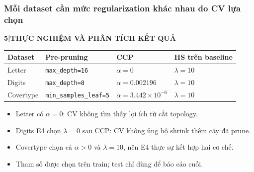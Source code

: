 \documentclass[aspectratio=169,12pt]{beamer}
\newcommand{\chaptertag}[2]{%
  \vspace{-0.16cm}%
  {\scriptsize\bfseries\textcolor{boxframe}{#1\enspace |\enspace #2}}\par
  \vspace{0.12cm}%
}
\begin{document}
\begin{frame}
  \frametitle{Mỗi dataset cần mức regularization khác nhau do CV lựa chọn}
  \chaptertag{5}{THỰC NGHIỆM VÀ PHÂN TÍCH KẾT QUẢ}
  \small
  \begin{tabularx}{\textwidth}{@{}L{2.5cm}YYY@{}}
    \toprule
    \textbf{Dataset} & \textbf{Pre-pruning} & \textbf{CCP} & \textbf{HS trên baseline} \\
    \midrule
    Letter & \texttt{max\_depth=16} & $\alpha=0$ & $\lambda=10$ \\
    Digits & \texttt{max\_depth=8} & $\alpha=0.002196$ & $\lambda=10$ \\
    Covertype & {\scriptsize\texttt{min\_samples\_leaf=5}} & $\alpha=3.442\times10^{-6}$ & $\lambda=10$ \\
    \bottomrule
  \end{tabularx}
  \par\vspace{0.35cm}
  \begin{itemize}
    \item Letter có $\alpha=0$: CV không tìm thấy lợi ích từ cắt topology.
    \item Digits E4 chọn $\lambda=0$ sau CCP: CV không ủng hộ shrink thêm cây đã prune.
    \item Covertype chọn cả $\alpha>0$ và $\lambda=10$, nên E4 thực sự kết hợp hai cơ chế.
    \item Tham số được chọn trên train; test chỉ dùng để báo cáo cuối.
  \end{itemize}
\end{frame}
\end{document}
